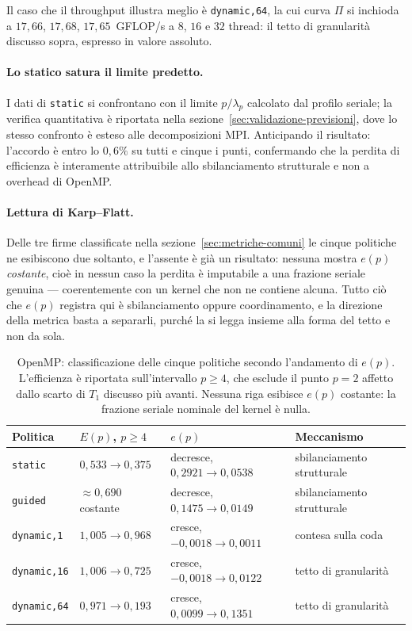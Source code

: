 Il caso che il throughput illustra meglio è \texttt{dynamic,64}, la cui curva
$\Pi$ si inchioda a $17{,}66$, $17{,}68$, $17{,}65$~GFLOP/s a $8$, $16$ e $32$
thread: il tetto di granularità discusso sopra, espresso in valore assoluto.

\paragraph{Lo statico satura il limite predetto.}
I dati di \texttt{static} si confrontano con il limite $p/\lambda_p$ calcolato
dal profilo seriale; la verifica quantitativa è riportata nella
sezione~\ref{sec:validazione-previsioni}, dove lo stesso confronto è esteso alle
decomposizioni MPI. Anticipando il risultato: l'accordo è entro lo $0{,}6\%$ su
tutti e cinque i punti, confermando che la perdita di efficienza è interamente
attribuibile allo sbilanciamento strutturale e non a overhead di OpenMP.

\paragraph{Lettura di Karp--Flatt.}
Delle tre firme classificate nella sezione~\ref{sec:metriche-comuni} le cinque
politiche ne esibiscono due soltanto, e l'assente è già un risultato: nessuna
mostra $e(p)$ \emph{costante}, cioè in nessun caso la perdita è imputabile a una
frazione seriale genuina --- coerentemente con un kernel che non ne contiene
alcuna. Tutto ciò che $e(p)$ registra qui è sbilanciamento oppure coordinamento,
e la direzione della metrica basta a separarli, purché la si legga insieme alla
forma del tetto e non da sola.
\vspace{2,5mm}
\begin{table}[htbp]
    \centering
    \begin{tabular}{llll}
        \hline
        Politica & $E(p)$, $p \ge 4$ & $e(p)$ & Meccanismo \\
        \hline
        \texttt{static}     & $0{,}533 \to 0{,}375$      & decresce, $0{,}2921 \to 0{,}0538$  & sbilanciamento strutturale \\
        \texttt{guided}     & $\approx 0{,}690$ costante & decresce, $0{,}1475 \to 0{,}0149$  & sbilanciamento strutturale \\
        \texttt{dynamic,1}  & $1{,}005 \to 0{,}968$      & cresce, $-0{,}0018 \to 0{,}0011$   & contesa sulla coda \\
        \texttt{dynamic,16} & $1{,}006 \to 0{,}725$      & cresce, $-0{,}0018 \to 0{,}0122$   & tetto di granularità \\
        \texttt{dynamic,64} & $0{,}971 \to 0{,}193$      & cresce, $0{,}0099 \to 0{,}1351$    & tetto di granularità \\
        \hline
    \end{tabular}
    \caption{OpenMP: classificazione delle cinque politiche secondo l'andamento
    di $e(p)$. L'efficienza è riportata sull'intervallo $p \ge 4$, che esclude
    il punto $p = 2$ affetto dallo scarto di $T_1$ discusso più avanti. Nessuna riga esibisce $e(p)$ costante: la frazione seriale
    nominale del kernel è nulla.}
    \label{tab:openmp-karp-flatt}
\end{table}


